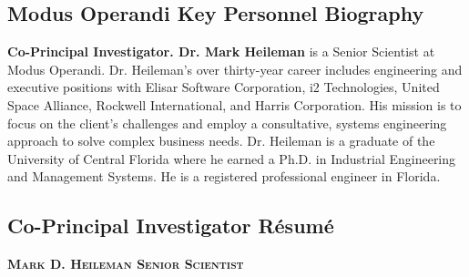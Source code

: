 \documentclass{sbir}
\begin{document}
\subsection{Modus Operandi Key Personnel Biography}\label{MDH}
{\bfseries Co-Principal Investigator. Dr. Mark Heileman} is a Senior Scientist at Modus Operandi. Dr. Heileman's over thirty-year career includes engineering and executive positions with Elisar Software Corporation, i2 Technologies, United Space Alliance, Rockwell International, and Harris Corporation. His mission is to focus on the client's challenges and employ a consultative, systems engineering approach to solve complex business needs. Dr. Heileman is a graduate of the University of Central Florida where he earned a Ph.D. in Industrial Engineering and Management Systems. He is a registered professional engineer in Florida.

\subsection{Co-Principal Investigator R\'esum\'e}
\textbf{\textsc{Mark D. Heileman \hfill Senior Scientist}}
\end{document}
